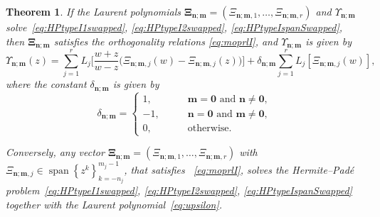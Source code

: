 \documentclass[reqno,centertags,11pt,draft]{amsart}
\newtheorem{thm}{Theorem}[section]
\newcommand{\set}[1]{\left\{#1\right\}}
\begin{document}


\begin{thm}
    If the Laurent polynomials %
    $\bm{\Xi}_{\bm{n};\bm{m}} = (\Xi_{\bm{n};\bm{m},1},\dots,\Xi_{\bm{n};\bm{m},r})$ and $\Upsilon_{\bm{n};\bm{m}}$ solve~\eqref{eq:HPtypeI1swapped}, \eqref{eq:HPtypeI2swapped}, \eqref{eq:HPtypeIspanSwapped},  then $\bm{\Xi}_{\bm{n};\bm{m}}$ satisfies the orthogonality relations \eqref{eq:moprlI}, and $\Upsilon_{\bm{n};\bm{m}}$ is given by
    \begin{equation}\label{eq:upsilon}
        \Upsilon_{\bm{n};\bm{m}}(z) =  \sum_{j = 1}^r L_j\Big[\frac{w+z}{w-z}\big(\Xi_{\bm{n};\bm{m},j}(w)-\Xi_{\bm{n};\bm{m},j}(z)\big)\Big] + {\delta_{\bm{n};\bm{m}} \sum_{j = 1}^r L_j[\Xi_{\bm{n};\bm{m},j}(w)]},
    \end{equation}
   {where the constant $\delta_{\bm{n};\bm{m}}$ is given by
   \begin{equation}\label{eq:delta}
       \delta_{\bm{n};\bm{m}} = \begin{cases}
           1, \qquad & \bm{m}=\bm{0} \mbox{ and } \bm{n}\neq\bm{0}, \\
           -1, \qquad & \bm{n}=\bm{0} \mbox{ and } \bm{m}\neq\bm{0}, \\
           0, \qquad &  \mbox{otherwise}.
       \end{cases}
   \end{equation}}

    Conversely, any vector $\bm{\Xi}_{\bm{n};\bm{m}} = (\Xi_{\bm{n};\bm{m},1},\dots,\Xi_{\bm{n};\bm{m},r})$ with $\Xi_{\bm{n};\bm{m},j} \in \operatorname{span}\set{z^k}_{k = -n_j}^{m_j-1}$, that satisfies %
    ~\eqref{eq:moprlI}, solves the Hermite--Pad\'{e} problem~\eqref{eq:HPtypeI1swapped}, \eqref{eq:HPtypeI2swapped}, \eqref{eq:HPtypeIspanSwapped} together with the Laurent polynomial~\eqref{eq:upsilon}.
\end{thm}


\end{document}

